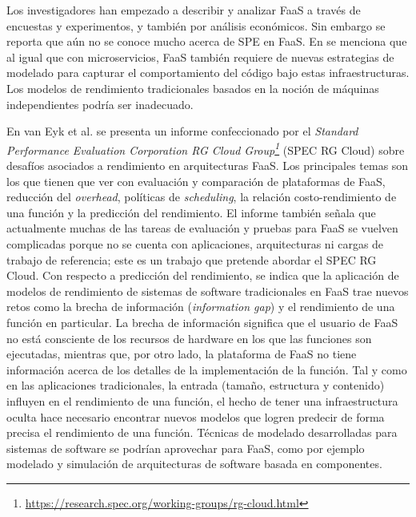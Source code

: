 Los investigadores han empezado a describir y analizar FaaS a través de encuestas y experimentos\cite{DBLP:journals/corr/BaldiniCCCFIMMR17,Crane:2017:ESA:3121050.3121086,8360324}, y también por análisis económicos\cite{7515686,8247460}. Sin embargo se reporta que aún no se conoce mucho acerca de SPE en FaaS. En \cite{Heinrich:2017:PEM:3053600.3053653} se menciona que al igual que con microservicios, FaaS también requiere de nuevas estrategias de modelado para capturar el comportamiento del código bajo estas infraestructuras. Los modelos de rendimiento tradicionales basados en la noción de máquinas independientes podría ser inadecuado. 

En van Eyk et al.\cite{vanEyk:2018:SRC:3185768.3186308} se presenta un informe confeccionado por el \emph{Standard Performance Evaluation Corporation RG Cloud Group\footnote{\url{https://research.spec.org/working-groups/rg-cloud.html}}} (SPEC RG Cloud) sobre desafíos asociados a rendimiento en arquitecturas FaaS. Los principales temas son los que tienen que ver con evaluación y comparación de plataformas de FaaS, reducción del \emph{overhead}, políticas de \emph{scheduling}, la relación costo-rendimiento de una función y la predicción del rendimiento. El informe también señala que actualmente muchas de las tareas de evaluación y pruebas para FaaS se vuelven complicadas porque no se cuenta con aplicaciones, arquitecturas ni cargas de trabajo de referencia; este es un trabajo que pretende abordar el SPEC RG Cloud. Con respecto a predicción del rendimiento, se indica que la aplicación de modelos de rendimiento de sistemas de software tradicionales en FaaS trae nuevos retos como la brecha de información (\emph{information gap}) y el rendimiento de una función en particular. La brecha de información significa que el usuario de FaaS no está consciente de los recursos de hardware en los que las funciones son ejecutadas, mientras que, por otro lado, la plataforma de FaaS no tiene información acerca de los detalles de la implementación de la función. Tal y como en las aplicaciones tradicionales, la entrada (tamaño, estructura y contenido) influyen en el rendimiento de una función, el hecho de tener una infraestructura oculta hace necesario encontrar nuevos modelos que logren predecir de forma precisa el rendimiento de una función. Técnicas de modelado desarrolladas para sistemas de software se podrían aprovechar para FaaS, como por ejemplo modelado y simulación de arquitecturas de software basada en componentes. 

